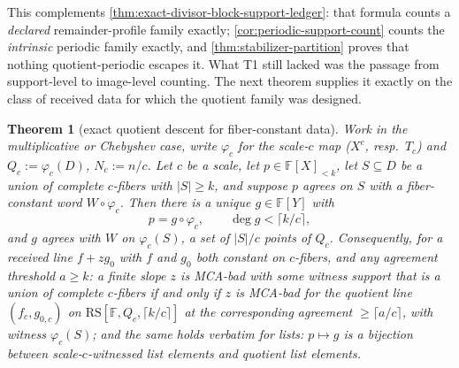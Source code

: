 \documentclass[11pt]{article}
\newtheorem{theorem}{Theorem}[section]
\theoremstyle{definition}
\theoremstyle{remark}
\newcommand{\F}{\mathbb{F}}
\newcommand{\RS}{\mathrm{RS}}
\begin{document}
This complements \cref{thm:exact-divisor-block-support-ledger}: that formula counts a \emph{declared} remainder-profile family exactly; \cref{cor:periodic-support-count} counts the \emph{intrinsic} periodic family exactly, and \cref{thm:stabilizer-partition} proves that nothing quotient-periodic escapes it. What T1 still lacked was the passage from support-level to image-level counting. The next theorem supplies it exactly on the class of received data for which the quotient family was designed.

\begin{theorem}[exact quotient descent for fiber-constant data]\label{thm:fiber-descent}
Work in the multiplicative or Chebyshev case, write $\varphi_c$ for the scale-$c$ map \textup($X^c$, resp.\ $T_c$\textup) and $Q_c:=\varphi_c(D)$, $N_c:=n/c$. Let $c$ be a scale, let $p\in\F[X]_{<k}$, let $S\subseteq D$ be a union of complete $c$-fibers with $|S|\ge k$, and suppose $p$ agrees on $S$ with a fiber-constant word $W\circ\varphi_c$. Then there is a unique $g\in\F[Y]$ with
\[
p=g\circ\varphi_c,\qquad \deg g<\lceil k/c\rceil,
\]
and $g$ agrees with $W$ on $\varphi_c(S)$, a set of $|S|/c$ points of $Q_c$. Consequently, for a received line $f+zg_0$ with $f$ and $g_0$ both constant on $c$-fibers, and any agreement threshold $a\ge k$: a finite slope $z$ is MCA-bad with some witness support that is a union of complete $c$-fibers if and only if $z$ is MCA-bad for the quotient line $(f_c,g_{0,c})$ on $\RS[\F,Q_c,\lceil k/c\rceil]$ at the corresponding agreement $\ge\lceil a/c\rceil$, with witness $\varphi_c(S)$; and the same holds verbatim for lists: $p\mapsto g$ is a bijection between scale-$c$-witnessed list elements and quotient list elements.
\end{theorem}
\end{document}
